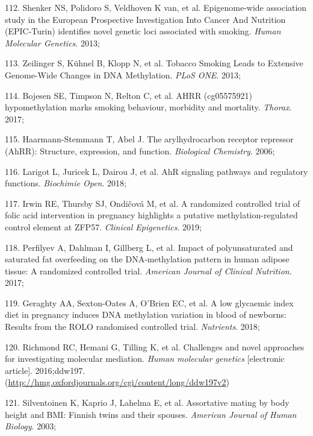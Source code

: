 \documentclass[11pt,twoside]{bristolthesis}
\newenvironment{cslreferences}%
  {}%
  {\par}
\begin{document}
\begin{cslreferences}
\leavevmode\hypertarget{ref-Shenker2013}{}%
112. Shenker NS, Polidoro S, Veldhoven K van, et al. Epigenome-wide association study in the European Prospective Investigation Into Cancer And Nutrition (EPIC-Turin) identifies novel genetic loci associated with smoking. \emph{Human Molecular Genetics}. 2013;

\leavevmode\hypertarget{ref-Zeilinger2013}{}%
113. Zeilinger S, Kühnel B, Klopp N, et al. Tobacco Smoking Leads to Extensive Genome-Wide Changes in DNA Methylation. \emph{PLoS ONE}. 2013;

\leavevmode\hypertarget{ref-Bojesen2017}{}%
114. Bojesen SE, Timpson N, Relton C, et al. AHRR (cg05575921) hypomethylation marks smoking behaviour, morbidity and mortality. \emph{Thorax}. 2017;

\leavevmode\hypertarget{ref-Haarmann-Stemmann2006}{}%
115. Haarmann-Stemmann T, Abel J. The arylhydrocarbon receptor repressor (AhRR): Structure, expression, and function. \emph{Biological Chemistry}. 2006;

\leavevmode\hypertarget{ref-Larigot2018}{}%
116. Larigot L, Juricek L, Dairou J, et al. AhR signaling pathways and regulatory functions. \emph{Biochimie Open}. 2018;

\leavevmode\hypertarget{ref-Irwin2019}{}%
117. Irwin RE, Thursby SJ, Ondičová M, et al. A randomized controlled trial of folic acid intervention in pregnancy highlights a putative methylation-regulated control element at ZFP57. \emph{Clinical Epigenetics}. 2019;

\leavevmode\hypertarget{ref-Perfilyev2017}{}%
118. Perfilyev A, Dahlman I, Gillberg L, et al. Impact of polyunsaturated and saturated fat overfeeding on the DNA-methylation pattern in human adipose tissue: A randomized controlled trial. \emph{American Journal of Clinical Nutrition}. 2017;

\leavevmode\hypertarget{ref-Geraghty2018}{}%
119. Geraghty AA, Sexton-Oates A, O'Brien EC, et al. A low glycaemic index diet in pregnancy induces DNA methylation variation in blood of newborns: Results from the ROLO randomised controlled trial. \emph{Nutrients}. 2018;

\leavevmode\hypertarget{ref-Richmond2016}{}%
120. Richmond RC, Hemani G, Tilling K, et al. Challenges and novel approaches for investigating molecular mediation. \emph{Human molecular genetics} {[}electronic article{]}. 2016;ddw197. (\url{http://hmg.oxfordjournals.org/cgi/content/long/ddw197v2})

\leavevmode\hypertarget{ref-Silventoinen2003}{}%
121. Silventoinen K, Kaprio J, Lahelma E, et al. Assortative mating by body height and BMI: Finnish twins and their spouses. \emph{American Journal of Human Biology}. 2003;


\end{cslreferences}
\end{document}
